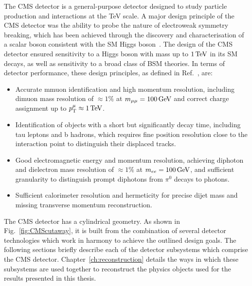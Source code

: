 The CMS detector is a general-purpose detector designed to 
study particle production and interactions at the TeV scale.
A major design principle of the CMS detector was the ability to 
probe the nature of electroweak symmetry breaking, which has been
achieved through the discovery and characterisation of a scalar boson
consistent with the SM Higgs boson~\cite{Chatrchyan:2012xdj,Chatrchyan:2013lba}. 
The design of the CMS detector
ensured sensitivity to a Higgs boson with mass up to
$1\,\text{Te\hspace{-.08em}V}$ in its SM decays, as well as sensitivity to a broad class
of BSM theories. In terms of detector performance, these design principles,
as defined in Ref.~\cite{Chatrchyan:2008aa}, are:

\begin{itemize}
  \item Accurate mmuon identification and high momentum resolution, including
    dimuon mass resolution of $\approx 1\%$ at $m_{\mu\mu} = 100\,\text{Ge\hspace{-.08em}V}$ and correct charge
    assignment up to $p_{\mathrm{T}}^{\mu}\approx 1\,\text{Te\hspace{-.08em}V}$.
  \item Identification of objects with a short but significantly decay time,
    including tau leptons and b hadrons, which requires fine position resolution 
    close to the interaction point to distinguish their displaced tracks.
  \item Good electromagnetic energy and momentum resolution, achieving
    diphoton and dielectron mass resolution of $\approx 1\%$ at $m_{ee} = 100\,\text{Ge\hspace{-.08em}V}$,
    and sufficient granularity to distinguish prompt diphotons from $\pi^{0}$ decays to photons.
  \item Sufficient calorimeter resolution and hermeticity for precise dijet mass
    and missing transverse momentum reconstruction.
\end{itemize}

The CMS detector has a cylindrical geometry. As shown in Fig.~\ref{fig:CMScutaway},
it is built from the combination
of several detector technologies which work in harmony to achieve the outlined design
goals. The following sections briefly describe each of the detector subsystems
which comprise the CMS detector. 
Chapter~\ref{ch:reconstruction} details the ways in which these subsystems 
are used together to reconstruct the physics objects used for the results
presented in this thesis.

